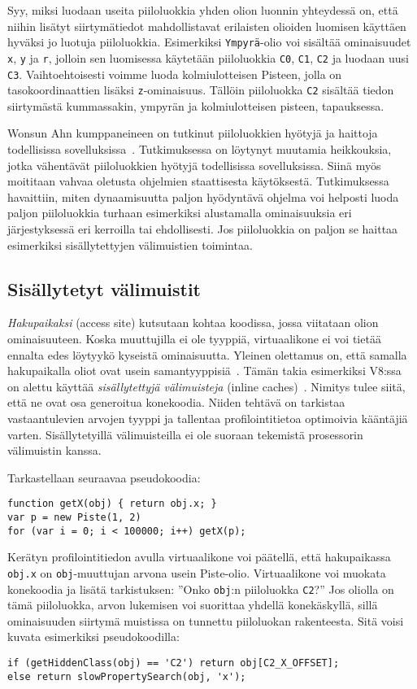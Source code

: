 Syy, miksi luodaan useita piiloluokkia yhden olion luonnin yhteydessä on, että niihin lisätyt siirtymätiedot mahdollistavat erilaisten olioiden luomisen käyttäen hyväksi jo luotuja piiloluokkia. Esimerkiksi \texttt{Ympyrä}-olio voi sisältää ominaisuudet \texttt{x}, \texttt{y} ja \texttt{r}, jolloin sen luomisessa käytetään piiloluokkia \texttt{C0}, \texttt{C1}, \texttt{C2} ja luodaan uusi \texttt{C3}. Vaihtoehtoisesti voimme luoda kolmiulotteisen Pisteen, jolla on tasokoordinaattien lisäksi \texttt{z}-ominaisuus. Tällöin piiloluokka \texttt{C2} sisältää tiedon siirtymästä kummassakin, ympyrän ja kolmiulotteisen pisteen, tapauksessa.

Wonsun Ahn kumppaneineen on tutkinut piiloluokkien hyötyjä ja haittoja todellisissa sovelluksissa~\cite{Ahn2014}. Tutkimuksessa on löytynyt muutamia heikkouksia, jotka vähentävät piiloluokkien hyötyjä todellisissa sovelluksissa. Siinä myös moititaan vahvaa oletusta ohjelmien staattisesta käytöksestä. Tutkimuksessa havaittiin, miten dynaamisuutta paljon hyödyntävä ohjelma voi helposti luoda paljon piiloluokkia turhaan esimerkiksi alustamalla ominaisuuksia eri järjestyksessä eri kerroilla tai ehdollisesti. Jos piiloluokkia on paljon se haittaa esimerkiksi sisällytettyjen välimuistien toimintaa.

\subsection{Sisällytetyt välimuistit}

\textit{Hakupaikaksi} (access site) kutsutaan kohtaa koodissa, jossa viitataan olion ominaisuuteen. Koska muuttujilla ei ole tyyppiä, virtuaalikone ei voi tietää ennalta edes löytyykö kyseistä ominaisuutta. Yleinen olettamus on, että samalla hakupaikalla oliot ovat usein samantyyppisiä~\cite[s.~2]{jsanalysis}. Tämän takia esimerkiksi V8:ssa on alettu käyttää \textit{sisällytettyjä välimuisteja} (inline caches)~\cite[s.~498]{Ahn2014}. Nimitys tulee siitä, että ne ovat osa generoitua konekoodia. Niiden tehtävä on tarkistaa vastaantulevien arvojen tyyppi ja tallentaa profilointitietoa optimoivia kääntäjiä varten. Sisällytetyillä välimuisteilla ei ole suoraan tekemistä prosessorin välimuistin kanssa.

Tarkastellaan seuraavaa pseudokoodia:
\begin{lstlisting}
function getX(obj) { return obj.x; }
var p = new Piste(1, 2)
for (var i = 0; i < 100000; i++) getX(p);
\end{lstlisting}
Kerätyn profilointitiedon avulla virtuaalikone voi päätellä, että hakupaikassa \texttt{obj.x} on \texttt{obj}-muuttujan arvona usein Piste-olio. Virtuaalikone voi muokata konekoodia ja lisätä tarkistuksen: ''Onko \texttt{obj}:n piiloluokka \texttt{C2}?'' Jos oliolla on tämä piiloluokka, arvon lukemisen voi suorittaa yhdellä konekäskyllä, sillä ominaisuuden siirtymä muistissa on tunnettu piiloluokan rakenteesta. Sitä voisi kuvata esimerkiksi pseudokoodilla:
\begin{lstlisting}
if (getHiddenClass(obj) == 'C2') return obj[C2_X_OFFSET];
else return slowPropertySearch(obj, 'x');
\end{lstlisting}

